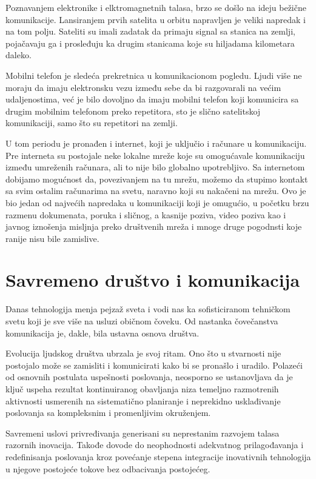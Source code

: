 \documentclass[10pt]{article}
\begin{document}
	Poznavanjem elektronike i elktromagnetnih talasa, brzo se došlo na ideju bežične komunikacije. Lansiranjem prvih satelita u orbitu napravljen je veliki napredak i na tom polju. Sateliti su imali zadatak da primaju signal sa stanica na zemlji, pojačavaju ga i prosleđuju ka drugim stanicama koje su hiljadama kilometara daleko. 
	
	Mobilni telefon je sledeća prekretnica u komunikacionom pogledu. Ljudi više ne moraju da imaju elektronsku vezu između sebe da bi razgovarali na većim udaljenostima, već je bilo dovoljno da imaju mobilni telefon koji komunicira sa drugim mobilnim telefonom preko repetitora, sto je slično satelitskoj komunikaciji, samo što su repetitori na zemlji. 
	
	U tom periodu je pronađen i internet, koji je uključio i računare u komunikaciju. Pre interneta su postojale neke lokalne mreže koje su omogućavale komunikaciju između umreženih računara, ali to nije bilo globalno upotrebljivo. Sa internetom dobijamo mogućnost da, povezivanjem na tu mrežu, možemo da stupimo kontakt sa svim ostalim računarima na svetu, naravno koji su nakačeni na mrežu. Ovo je bio jedan od najvećih napredaka u komunikaciji koji je omugućio, u početku brzu razmenu dokumenata, poruka i sličnog, a kasnije poziva, video poziva kao i javnog iznošenja misljnja preko društvenih mreža i mnoge druge pogodnsti koje ranije nisu bile zamislive.

   
    \section{Savremeno društvo i komunikacija}
    
    
	Danas tehnologija menja pejzaž sveta i vodi nas ka sofisticiranom tehničkom svetu koji je sve više na usluzi običnom čoveku. Od nastanka čovečanstva komunikacija je, dakle, bila ustavna osnova društva.
	
	Evolucija ljudskog društva ubrzala je svoj ritam. Ono što u stvarnosti nije postojalo može se zamisliti i komunicirati kako bi se pronašlo i uradilo. Polazeći od osnovnih postulata uspešnosti poslovanja, neosporno se ustanovljava da je ključ uspeha rezultat kontinuiranog obavljanja niza temeljno razmotrenih aktivnosti usmerenih na sistematično planiranje i neprekidno usklađivanje poslovanja sa kompleksnim i promenljivim okruženjem. 
	
	Savremeni uslovi privređivanja generisani su neprestanim razvojem talasa razornih inovacija.
	Takođe dovode do neophodnosti adekvatnog prilagođavanja i redefinisanja poslovanja kroz povećanje stepena integracije inovativnih tehnologija u njegove postojeće tokove bez odbacivanja postojećeg.
	
\end{document}

